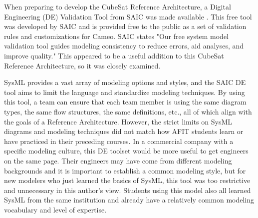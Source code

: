 When preparing to develop the CubeSat Reference Architecture, a Digital Engineering (DE) Validation Tool from SAIC was made available \citep{SAIC}. This free tool was developed by SAIC and is provided free to the public as a set of validation rules and customizations for Cameo. SAIC states "Our free system model validation tool guides modeling consistency to reduce errors, aid analyses, and improve quality." This appeared to be a useful addition to this CubeSat Reference Architecture, so it was closely examined. 

SysML provides a vast array of modeling options and styles, and the SAIC DE tool aims to limit the language and standardize modeling techniques. By using this tool, a team can ensure that each team member is using the same diagram types, the same flow structures, the same definitions, etc., all of which align with the goals of a Reference Architecture. However, the strict limits on SysML diagrams and modeling techniques did not match how AFIT students learn or have practiced in their preceding courses. In a commercial company with a specific modeling culture, this DE toolset would be more useful to get engineers on the same page. Their engineers may have come from different modeling backgrounds and it is important to establish a common modeling style, but for new modelers who just learned the basics of SysML, this tool was too restrictive and unnecessary in this author's view. Students using this model also all learned SysML from the same institution and already have a relatively common modeling vocabulary and level of expertise. 


